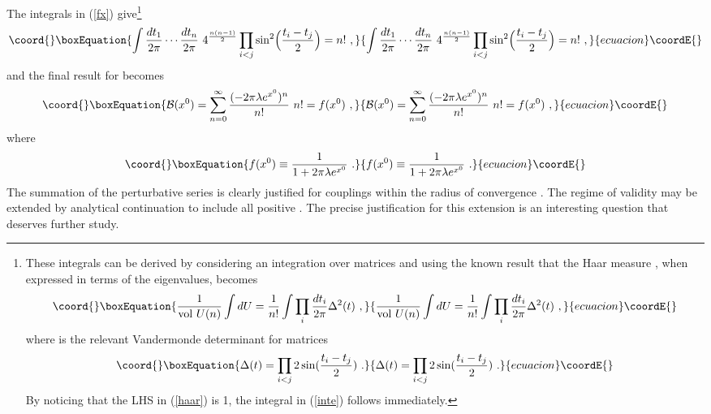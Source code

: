 \documentclass[a4paper,12pt]{article}
\begin{document}
The integrals in (\ref{fx}) give\footnote{These integrals can be derived by considering
an integration over \coordHE{} matrices and using the known result that the \coordHE{} Haar 
measure \coordHE{}, when expressed in terms of the eigenvalues, becomes
\begin{equation}\coord{}\boxEquation{
 {1 \over {\rm vol}~U(n)}\int dU = {1 \over n!} \int \prod_i {dt_i \over 2 \pi}  \Delta^2(t)~,
\label{haar}
}{
 {1 \over {\rm vol}~U(n)}\int dU = {1 \over n!} \int \prod_i {dt_i \over 2 \pi}  \Delta^2(t)~,
}{ecuacion}\coordE{}\end{equation}
 where \coordHE{} is the relevant Vandermonde determinant for \coordHE{} matrices
\begin{equation}\coord{}\boxEquation{
\Delta(t)=\prod_{i < j} 2 \sin({t_i -t_j \over 2})~.
}{
\Delta(t)=\prod_{i < j} 2 \sin({t_i -t_j \over 2})~.
}{ecuacion}\coordE{}\end{equation}
By noticing that the LHS in (\ref{haar}) is 1, the integral in (\ref{inte}) follows immediately. 
}
\begin{equation}\coord{}\boxEquation{
 \int {dt_1  \over 2\pi} \cdots {dt_n \over 2 \pi}~4^{n(n-1)\over 2}
\prod_{i< j} \sin^2\Bigl({t_i - t_j \over 2}\Bigr) = n!~,
\label{inte}
}{
 \int {dt_1  \over 2\pi} \cdots {dt_n \over 2 \pi}~4^{n(n-1)\over 2}
\prod_{i< j} \sin^2\Bigl({t_i - t_j \over 2}\Bigr) = n!~,
}{ecuacion}\coordE{}\end{equation}
and the final result for \coordHE{} becomes
\begin{equation}\coord{}\boxEquation{
{\cal B}(x^0)= \sum_{n=0}^\infty {(-2\pi \lambda e^{x^0})^n \over n!}  ~n! =
 f(x^0)~,
}{
{\cal B}(x^0)= \sum_{n=0}^\infty {(-2\pi \lambda e^{x^0})^n \over n!}  ~n! =
 f(x^0)~,
}{ecuacion}\coordE{}\end{equation}
where
\begin{equation}\coord{}\boxEquation{
 f(x^0)\equiv {1 \over 1 + 2\pi \lambda e^{x^0}} ~.
}{
 f(x^0)\equiv {1 \over 1 + 2\pi \lambda e^{x^0}} ~.
}{ecuacion}\coordE{}\end{equation}
The summation of the perturbative series is clearly justified for couplings within the radius of 
convergence \coordHE{}. The regime of validity may be extended 
by analytical continuation to include all positive \myHighlight{$\lambda$}\coordHE{}. The precise justification
for this extension is an interesting question that deserves further study.
\end{document}

